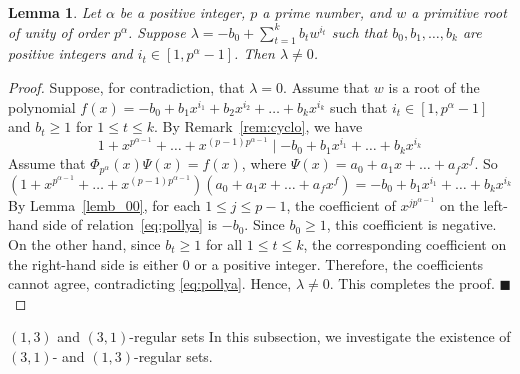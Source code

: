 \documentclass[12pt]{article}
\makeatletter
\renewcommand{\subsection}{\@startsection{subsection}{2}{0mm}{7mm}{4mm}
{\bf\large}}
\newtheorem{lem}[formula]{Lemma}
\makeatother
\begin{document}
  	\begin{lem}\label{lemb_0}
  	Let $\alpha$ be a positive integer, $p$ a prime number, and $w$ a primitive root of unity of order $p^\alpha$. Suppose
  	$
  	\lambda = -b_0 + \sum_{t=1}^{k} b_t w^{i_t}$
  	such that $b_0,b_1,\ldots,b_k$ are positive integers and $i_t \in [1,p^{\alpha}-1]$. Then $\lambda \neq 0$.
  	 \end{lem}
  	\begin{proof}
  	Suppose, for contradiction, that $\lambda = 0$. Assume that $w$ is a root of the polynomial
  	$
  	f(x) = -b_0 + b_1 x^{i_1} + b_2 x^{i_2} + \dots + b_k x^{i_k}
  	$
  	such that $i_t \in [1, p^\alpha - 1]$ and $b_t \ge 1$ for $1 \le t \le k$. By Remark~\ref{rem:cyclo}, we have
  	\[
  	1 + x^{p^{\alpha-1}} + \dots + x^{(p-1)p^{\alpha-1}} \mid -b_0 + b_1 x^{i_1} + \dots + b_k x^{i_k}
  	\]
  	Assume that $\Phi_{p^\alpha}(x)\Psi(x) = f(x)$, where $\Psi(x) = a_0 + a_1 x + \dots + a_f x^f$. So
  		\begin{equation}\label{eq:pollya}
  		\left(1 + x^{p^{\alpha-1}} + \dots + x^{(p-1)p^{\alpha-1}}\right) \left(a_0 + a_1 x + \dots + a_f x^f\right)=	
  		-b_0 + b_1 x^{i_1} + \dots + b_k x^{i_k}
  	\end{equation}
  	By Lemma~\ref{lemb_00}, for each $1\le j\le p-1$, the coefficient of
  	$x^{jp^{\alpha-1}}$ on the left-hand side of relation~\eqref{eq:pollya}
  	is $-b_0$. Since $b_0\ge1$, this coefficient is negative. On the other
  	hand, since $b_t\ge1$ for all $1\le t\le k$, the corresponding
  	coefficient on the right-hand side is either $0$ or a positive integer.
  	Therefore, the coefficients cannot agree, contradicting
  	\eqref{eq:pollya}. Hence, $\lambda\neq0$. This completes the proof.
  \hfill$\blacksquare$
  \end{proof}		
   \subsection{$(1,3)$ and $(3,1)$-regular sets}
   In this subsection, we investigate the existence of $(3,1)$- and $(1,3)$-regular sets.
\end{document}
